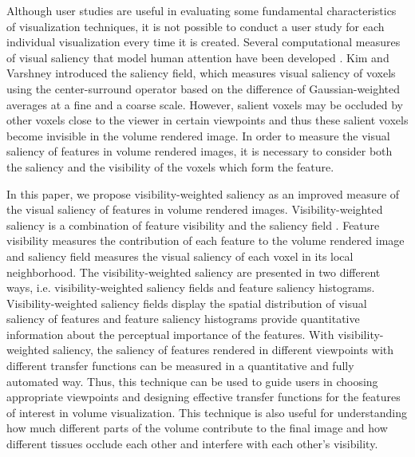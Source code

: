 Although user studies are useful in evaluating some fundamental characteristics of visualization techniques, it is not possible to conduct a user study for each individual visualization every time it is created.
Several computational measures of visual saliency that model human attention have been developed \cite{itti_model_1998} \cite{harel_graph-based_2006}.
Kim and Varshney \cite{kim_saliency-guided_2006} introduced the saliency field, which measures visual saliency of voxels using the center-surround operator based on the difference of Gaussian-weighted averages at a fine and a coarse scale.
However, salient voxels may be occluded by other voxels close to the viewer in certain viewpoints and thus these salient voxels become invisible in the volume rendered image. In order to measure the visual saliency of features in volume rendered images, it is necessary to consider both the saliency and the visibility of the voxels which form the feature.

In this paper, we propose visibility-weighted saliency as an improved measure of the visual saliency of features in volume rendered images. Visibility-weighted saliency is a combination of feature visibility \cite{wang_efficient_2011} and the saliency field \cite{kim_saliency-guided_2006}.
Feature visibility measures the contribution of each feature to the volume rendered image and saliency field measures the visual saliency of each voxel in its local neighborhood.
The visibility-weighted saliency are presented in two different ways, i.e. visibility-weighted saliency fields and feature saliency histograms. Visibility-weighted saliency fields display the spatial distribution of visual saliency of features and feature saliency histograms provide quantitative information about the perceptual importance of the features.
With visibility-weighted saliency, the saliency of features rendered in different viewpoints with different transfer functions can be measured in a quantitative and fully automated way.
Thus, this technique can be used to guide users in choosing appropriate viewpoints and designing effective transfer functions for the features of interest in volume visualization.
This technique is also useful for understanding how much different parts of the volume contribute to the final image and how different tissues occlude each other and interfere with each other's visibility.

